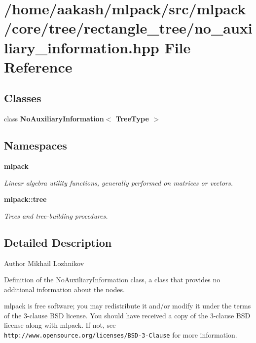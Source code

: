 \section{/home/aakash/mlpack/src/mlpack/core/tree/rectangle\+\_\+tree/no\+\_\+auxiliary\+\_\+information.hpp File Reference}
\label{no__auxiliary__information_8hpp}
\subsection*{Classes}
\begin{DoxyCompactItemize}
\item 
class \textbf{ No\+Auxiliary\+Information$<$ Tree\+Type $>$}
\end{DoxyCompactItemize}
\subsection*{Namespaces}
\begin{DoxyCompactItemize}
\item 
 \textbf{ mlpack}
\begin{DoxyCompactList}\small\item\em Linear algebra utility functions, generally performed on matrices or vectors. \end{DoxyCompactList}\item 
 \textbf{ mlpack\+::tree}
\begin{DoxyCompactList}\small\item\em Trees and tree-\/building procedures. \end{DoxyCompactList}\end{DoxyCompactItemize}


\subsection{Detailed Description}
\begin{DoxyAuthor}{Author}
Mikhail Lozhnikov
\end{DoxyAuthor}
Definition of the No\+Auxiliary\+Information class, a class that provides no additional information about the nodes.

mlpack is free software; you may redistribute it and/or modify it under the terms of the 3-\/clause B\+SD license. You should have received a copy of the 3-\/clause B\+SD license along with mlpack. If not, see {\tt http\+://www.\+opensource.\+org/licenses/\+B\+S\+D-\/3-\/\+Clause} for more information. 